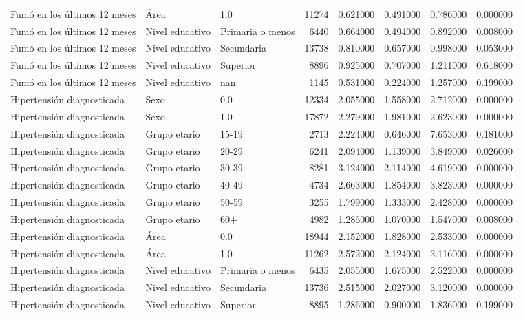 \begin{longtable}{lllrrrrr}
Fumó en los últimos 12 meses & Área & 1.0 & 11274 & 0.621000 & 0.491000 & 0.786000 & 0.000000 \\
Fumó en los últimos 12 meses & Nivel educativo & Primaria o menos & 6440 & 0.664000 & 0.494000 & 0.892000 & 0.008000 \\
Fumó en los últimos 12 meses & Nivel educativo & Secundaria & 13738 & 0.810000 & 0.657000 & 0.998000 & 0.053000 \\
Fumó en los últimos 12 meses & Nivel educativo & Superior & 8896 & 0.925000 & 0.707000 & 1.211000 & 0.618000 \\
Fumó en los últimos 12 meses & Nivel educativo & nan & 1145 & 0.531000 & 0.224000 & 1.257000 & 0.199000 \\
Hipertensión diagnosticada & Sexo & 0.0 & 12334 & 2.055000 & 1.558000 & 2.712000 & 0.000000 \\
Hipertensión diagnosticada & Sexo & 1.0 & 17872 & 2.279000 & 1.981000 & 2.623000 & 0.000000 \\
Hipertensión diagnosticada & Grupo etario & 15-19 & 2713 & 2.224000 & 0.646000 & 7.653000 & 0.181000 \\
Hipertensión diagnosticada & Grupo etario & 20-29 & 6241 & 2.094000 & 1.139000 & 3.849000 & 0.026000 \\
Hipertensión diagnosticada & Grupo etario & 30-39 & 8281 & 3.124000 & 2.114000 & 4.619000 & 0.000000 \\
Hipertensión diagnosticada & Grupo etario & 40-49 & 4734 & 2.663000 & 1.854000 & 3.823000 & 0.000000 \\
Hipertensión diagnosticada & Grupo etario & 50-59 & 3255 & 1.799000 & 1.333000 & 2.428000 & 0.000000 \\
Hipertensión diagnosticada & Grupo etario & 60+ & 4982 & 1.286000 & 1.070000 & 1.547000 & 0.008000 \\
Hipertensión diagnosticada & Área & 0.0 & 18944 & 2.152000 & 1.828000 & 2.533000 & 0.000000 \\
Hipertensión diagnosticada & Área & 1.0 & 11262 & 2.572000 & 2.124000 & 3.116000 & 0.000000 \\
Hipertensión diagnosticada & Nivel educativo & Primaria o menos & 6435 & 2.055000 & 1.675000 & 2.522000 & 0.000000 \\
Hipertensión diagnosticada & Nivel educativo & Secundaria & 13736 & 2.515000 & 2.027000 & 3.120000 & 0.000000 \\
Hipertensión diagnosticada & Nivel educativo & Superior & 8895 & 1.286000 & 0.900000 & 1.836000 & 0.199000 \\

\end{longtable}
